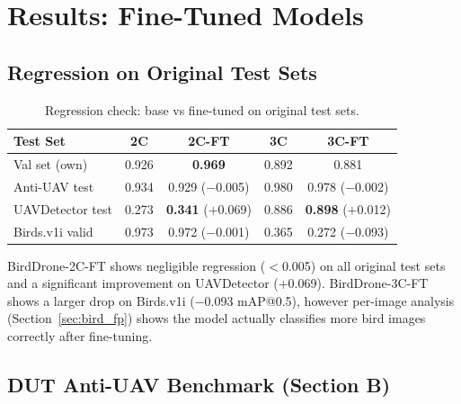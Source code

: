\documentclass[11pt]{article}
\begin{document}
\section{Results: Fine-Tuned Models}

\subsection{Regression on Original Test Sets}

\begin{table}[H]
\centering
\caption{Regression check: base vs fine-tuned on original test sets.}
\label{tab:regression}
\begin{tabular}{lcccc}
\toprule
\textbf{Test Set} & \textbf{2C} & \textbf{2C-FT} & \textbf{3C} & \textbf{3C-FT} \\
\midrule
Val set (own)       & 0.926 & \textbf{0.969} & 0.892 & 0.881 \\
Anti-UAV test       & 0.934 & 0.929 ($-$0.005) & 0.980 & 0.978 ($-$0.002) \\
UAVDetector test    & 0.273 & \textbf{0.341} ($+$0.069) & 0.886 & \textbf{0.898} ($+$0.012) \\
Birds.v1i valid     & 0.973 & 0.972 ($-$0.001) & 0.365 & 0.272 ($-$0.093) \\
\bottomrule
\end{tabular}
\end{table}

BirdDrone-2C-FT shows negligible regression ($<$0.005) on all original test
sets and a significant improvement on UAVDetector (+0.069). BirdDrone-3C-FT
shows a larger drop on Birds.v1i ($-$0.093 mAP@0.5), however per-image
analysis (Section~\ref{sec:bird_fp}) shows the model actually classifies
more bird images correctly after fine-tuning.

\subsection{DUT Anti-UAV Benchmark (Section B)}
\end{document}
